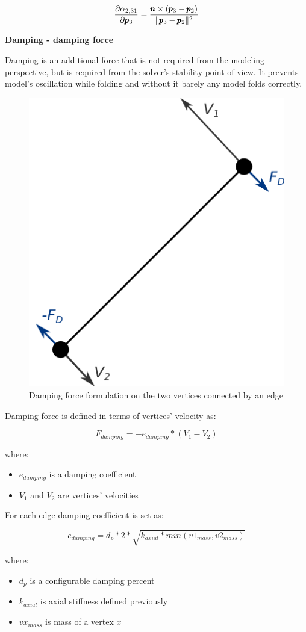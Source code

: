 \begin{equation} \label{solver:face_force3}
	\frac{\partial \alpha _{2,31}}{\partial \pmb{p}_3} = \frac{\pmb{n} \times (\pmb{p}_3 - \pmb{p}_2)}{\|\pmb{p}_3 - \pmb{p}_2\|^2}
\end{equation}


\medskip
\textbf{Damping - damping force}
\smallskip

Damping is an additional force that is not required from the modeling perspective,
but is required from the solver's stability point of view. It prevents model's
oscillation while folding and without it barely any model folds correctly.

\begin{figure}[H]
	\caption{Damping force formulation on the two vertices connected by an edge}
    \centering
	\includegraphics[width=.4\linewidth]{assets/3-damping_force_edge.png}
\end{figure}

Damping force is defined in terms of vertices' velocity as:


$$F_{damping} = -e_{damping} * (V_1 - V_2)$$

where:

\begin{itemize}
	\item $e_{damping}$ is a damping coefficient 
	\item $V_1$ and $V_2$ are vertices' velocities
\end{itemize}

For each edge damping coefficient is set as:

$$ e_{damping} = d_p * 2 * \sqrt{k_{axial} * min(v1_{mass}, v2_{mass})} $$

where:

\begin{itemize}
	\item $d_p$ is a configurable damping percent
	\item $k_{axial}$ is axial stiffness defined previously
	\item $vx_{mass}$ is mass of a vertex $x$
\end{itemize}

